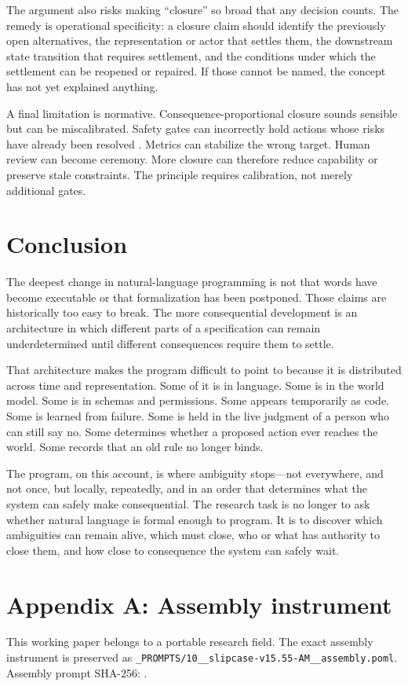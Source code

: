 \documentclass[11pt]{article}
\begin{document}
The argument also risks making ``closure'' so broad that any decision counts. The remedy is operational specificity: a closure claim should identify the previously open alternatives, the representation or actor that settles them, the downstream state transition that requires settlement, and the conditions under which the settlement can be reopened or repaired. If those cannot be named, the concept has not yet explained anything.

A final limitation is normative. Consequence-proportional closure sounds sensible but can be miscalibrated. Safety gates can incorrectly hold actions whose risks have already been resolved \parencite{serdar2026steerbench}. Metrics can stabilize the wrong target. Human review can become ceremony. More closure can therefore reduce capability or preserve stale constraints. The principle requires calibration, not merely additional gates.

\section{Conclusion}
The deepest change in natural-language programming is not that words have become executable or that formalization has been postponed. Those claims are historically too easy to break. The more consequential development is an architecture in which different parts of a specification can remain underdetermined until different consequences require them to settle.

That architecture makes the program difficult to point to because it is distributed across time and representation. Some of it is in language. Some is in the world model. Some is in schemas and permissions. Some appears temporarily as code. Some is learned from failure. Some is held in the live judgment of a person who can still say no. Some determines whether a proposed action ever reaches the world. Some records that an old rule no longer binds.

The program, on this account, is where ambiguity stops---not everywhere, and not once, but locally, repeatedly, and in an order that determines what the system can safely make consequential. The research task is no longer to ask whether natural language is formal enough to program. It is to discover which ambiguities can remain alive, which must close, who or what has authority to close them, and how close to consequence the system can safely wait.

\printbibliography

\appendix
\section*{Appendix A: Assembly instrument}
This working paper belongs to a portable research field. The exact assembly instrument is preserved as \texttt{\_PROMPTS/10\_\_slipcase-v15.55-AM\_\_assembly.poml}. Assembly prompt SHA-256: \texttt{}.
\end{document}
